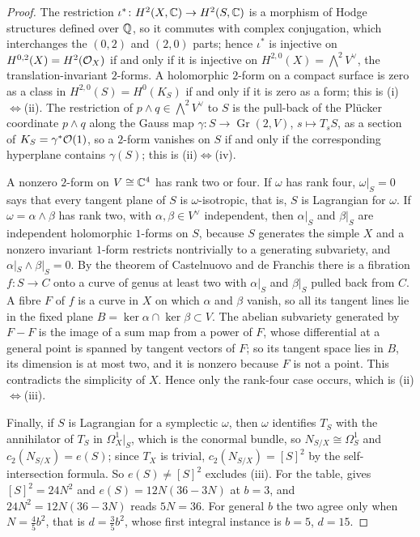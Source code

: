 \begin{proof}
The restriction $\iota^{*}\colon H^{2}(X,\mathbb{C})\to H^{2}(S,\mathbb{C})$ is a morphism
of Hodge structures defined over $\mathbb{Q}$, so it commutes with complex
conjugation, which interchanges the $(0,2)$ and $(2,0)$ parts; hence
$\iota^{*}$ is injective on $H^{0,2}(X)=H^{2}(\mathcal{O}_{X})$ if and only if it is
injective on $H^{2,0}(X)=\bigwedge^{2}V^{\vee}$, the translation-invariant
$2$-forms. A holomorphic $2$-form on a compact surface is zero as a class in
$H^{2,0}(S)=H^{0}(K_{S})$ if and only if it is zero as a form; this is
(i)$\Leftrightarrow$(ii). The restriction of $p\wedge q\in\bigwedge^{2}V^{\vee}$
to $S$ is the pull-back of the Pl\"ucker coordinate $p\wedge q$ along the
Gauss map $\gamma\colon S\to\operatorname{Gr}(2,V)$, $s\mapsto T_{s}S$, as a
section of $K_{S}=\gamma^{*}\mathcal{O}(1)$, so a $2$-form vanishes on $S$ if and
only if the corresponding hyperplane contains $\gamma(S)$; this is
(ii)$\Leftrightarrow$(iv).

A nonzero $2$-form on $V\cong\mathbb{C}^{4}$ has rank two or four. If $\omega$ has
rank four, $\omega|_{S}=0$ says that every tangent plane of $S$ is
$\omega$-isotropic, that is, $S$ is Lagrangian for $\omega$. If
$\omega=\alpha\wedge\beta$ has rank two, with $\alpha,\beta\in V^{\vee}$
independent, then $\alpha|_{S}$ and $\beta|_{S}$ are independent
holomorphic $1$-forms on $S$, because $S$ generates the simple $X$ and a nonzero
invariant $1$-form restricts nontrivially to a generating subvariety, and
$\alpha|_{S}\wedge\beta|_{S}=0$. By the theorem of Castelnuovo and de
Franchis \cite{BHPV04} there is a fibration
$f\colon S\to C$ onto a curve of genus at least two with $\alpha|_{S}$ and
$\beta|_{S}$ pulled back from $C$. A fibre $F$ of $f$ is a curve in $X$ on
which $\alpha$ and $\beta$ vanish, so all its tangent lines lie in the fixed
plane $B=\ker\alpha\cap\ker\beta\subset V$. The abelian subvariety generated
by $F-F$ is the image of a sum map from a power of $F$, whose differential at
a general point is spanned by tangent vectors of $F$; so its tangent space
lies in $B$, its dimension is at most two, and it is nonzero because $F$ is
not a point. This contradicts the simplicity of $X$. Hence only the
rank-four case occurs, which is (ii)$\Leftrightarrow$(iii).

Finally, if $S$ is Lagrangian for a symplectic $\omega$, then $\omega$
identifies $T_{S}$ with the annihilator of $T_{S}$ in $\Omega^{1}_{X}|_{S}$,
which is the conormal bundle, so $N_{S/X}\cong\Omega^{1}_{S}$ and
$c_{2}(N_{S/X})=e(S)$; since $T_{X}$ is trivial, $c_{2}(N_{S/X})=[S]^{2}$ by
the self-intersection formula. So $e(S)\ne[S]^{2}$ excludes (iii). For the
table,  gives $[S]^{2}=24N^{2}$ and
$e(S)=12N(36-3N)$ at $b=3$, and $24N^{2}=12N(36-3N)$ reads $5N=36$. For
general $b$ the two agree only when $N=\tfrac45b^{2}$, that is
$d=\tfrac35b^{2}$, whose first integral instance is $b=5$, $d=15$.
\end{proof}

